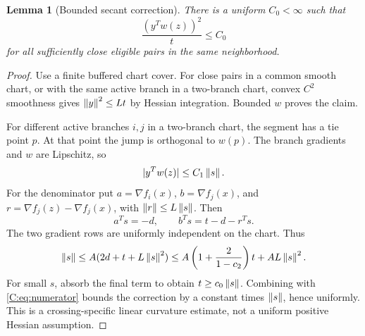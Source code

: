 \documentclass[10pt,oneside,openany]{book}
\newtheorem{lemma}{Lemma}[chapter]
\theoremstyle{remark}\newtheorem{remark}{Remark}[chapter]
\begin{document}
\begin{lemma}[Bounded secant correction]\label{C:lem:secant}
There is a uniform $C_0<\infty$ such that
\[
 \frac{(y^Tw(z))^2}{t}\le C_0
\]
for all sufficiently close eligible pairs in the same neighborhood.
\end{lemma}
\begin{proof}
Use a finite buffered chart cover. For close pairs in a common smooth chart, or with the same active branch in a two-branch chart, convex $C^2$ smoothness gives $\left\lVert y\right\rVert^2\le L t$ by Hessian integration. Bounded $w$ proves the claim.

For different active branches $i,j$ in a two-branch chart, the segment has a tie point $p$. At that point the jump is orthogonal to $w(p)$. The branch gradients and $w$ are Lipschitz, so
\begin{equation}\label{C:eq:numerator}
 |y^Tw(z)|\le C_1\left\lVert s\right\rVert.
\end{equation}
For the denominator put $a=\nabla f_i(x)$, $b=\nabla f_j(x)$, and $r=\nabla f_j(z)-\nabla f_j(x)$, with $\left\lVert r\right\rVert\le L\left\lVert s\right\rVert$. Then
\[
 a^Ts=-d,\qquad b^Ts=t-d-r^Ts.
\]
The two gradient rows are uniformly independent on the chart. Thus
\[
 \left\lVert s\right\rVert\le A(2d+t+L\left\lVert s\right\rVert^2)
 \le A\left(1+\frac{2}{1-c_2}\right)t+AL\left\lVert s\right\rVert^2.
\]
For small $s$, absorb the final term to obtain $t\ge c_0\left\lVert s\right\rVert$. Combining with \eqref{C:eq:numerator} bounds the correction by a constant times $\left\lVert s\right\rVert$, hence uniformly. This is a crossing-specific linear curvature estimate, not a uniform positive Hessian assumption.
\end{proof}


\setcounter{section}{5}
\setcounter{theorem}{7}
\setcounter{equation}{15}
\end{document}

